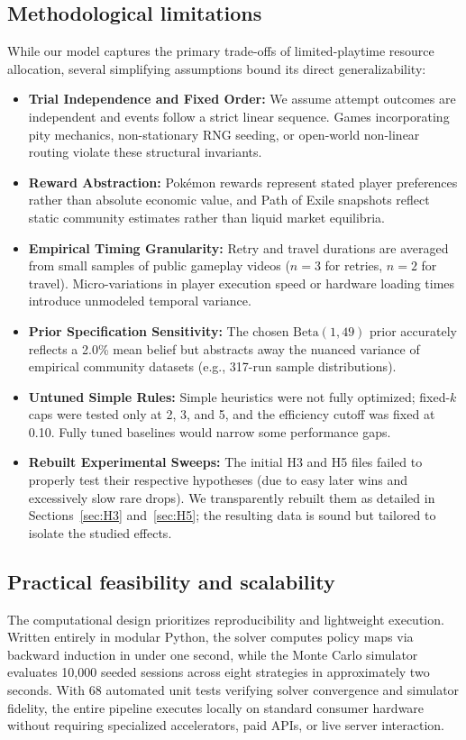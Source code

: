 \documentclass[11pt,a4paper]{article}
\begin{document}
\subsection{Methodological limitations}
While our model captures the primary trade-offs of limited-playtime resource allocation, several simplifying assumptions bound its direct generalizability:
\begin{itemize}
\item \textbf{Trial Independence and Fixed Order:} We assume attempt outcomes are independent and events follow a strict linear sequence. Games incorporating pity mechanics, non-stationary RNG seeding, or open-world non-linear routing violate these structural invariants.
\item \textbf{Reward Abstraction:} Pok\'emon rewards represent stated player preferences rather than absolute economic value, and Path of Exile snapshots reflect static community estimates rather than liquid market equilibria.
\item \textbf{Empirical Timing Granularity:} Retry and travel durations are averaged from small samples of public gameplay videos ($n=3$ for retries, $n=2$ for travel). Micro-variations in player execution speed or hardware loading times introduce unmodeled temporal variance.
\item \textbf{Prior Specification Sensitivity:} The chosen $\mathrm{Beta}(1,49)$ prior accurately reflects a 2.0\% mean belief but abstracts away the nuanced variance of empirical community datasets (e.g., 317-run sample distributions).
\item \textbf{Untuned Simple Rules:} Simple heuristics were not fully optimized; fixed-$k$ caps were tested only at 2, 3, and 5, and the efficiency cutoff was fixed at 0.10. Fully tuned baselines would narrow some performance gaps.
\item \textbf{Rebuilt Experimental Sweeps:} The initial H3 and H5 files failed to properly test their respective hypotheses (due to easy later wins and excessively slow rare drops). We transparently rebuilt them as detailed in Sections~\ref{sec:H3} and~\ref{sec:H5}; the resulting data is sound but tailored to isolate the studied effects.
\end{itemize}

\subsection{Practical feasibility and scalability}
The computational design prioritizes reproducibility and lightweight execution. Written entirely in modular Python, the solver computes policy maps via backward induction in under one second, while the Monte Carlo simulator evaluates 10,000 seeded sessions across eight strategies in approximately two seconds. With 68 automated unit tests verifying solver convergence and simulator fidelity, the entire pipeline executes locally on standard consumer hardware without requiring specialized accelerators, paid APIs, or live server interaction.
\end{document}
